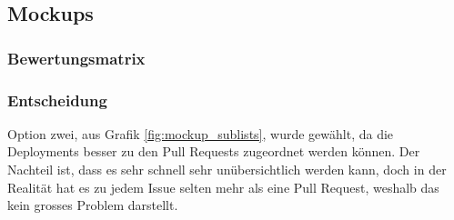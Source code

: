 \subsection{Mockups}
\subsubsection{Bewertungsmatrix}
\begin{center}
\end{center}

\subsubsection{Entscheidung}
Option zwei, aus Grafik \ref{fig:mockup_sublists}, wurde gewählt, da die Deployments besser zu den Pull Requests
zugeordnet werden können. Der Nachteil ist, dass es sehr schnell sehr unübersichtlich werden kann, doch in der Realität
hat es zu jedem Issue selten mehr als eine Pull Request, weshalb das kein grosses Problem darstellt.
